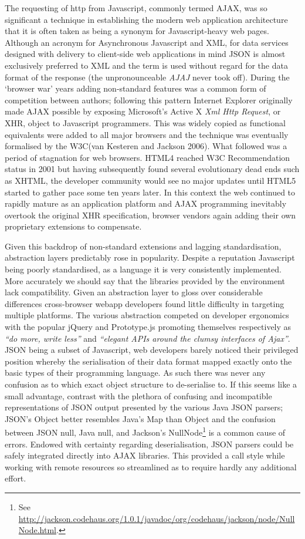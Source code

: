 \documentclass[]{article}
\begin{document}
The requesting of http from Javascript, commonly termed AJAX, was so
significant a technique in establishing the modern web application
architecture that it is often taken as being a synonym for
Javascript-heavy web pages. Although an acronym for Asynchronous
Javascript and XML, for data services designed with delivery to
client-side web applications in mind JSON is almost exclusively
preferred to XML and the term is used without regard for the data format
of the response (the unpronounceable \emph{AJAJ} never took off). During
the `browser war' years adding non-standard features was a common form
of competition between authors; following this pattern Internet Explorer
originally made AJAX possible by exposing Microsoft's Active X \emph{Xml
Http Request}, or XHR, object to Javascript programmers. This was widely
copied as functional equivalents were added to all major browsers and
the technique was eventually formalised by the W3C(van Kesteren and
Jackson 2006). What followed was a period of stagnation for web
browsers. HTML4 reached W3C Recommendation status in 2001 but having
subsequently found several evolutionary dead ends such as XHTML, the
developer community would see no major updates until HTML5 started to
gather pace some ten years later. In this context the web continued to
rapidly mature as an application platform and AJAX programming
inevitably overtook the original XHR specification, browser vendors
again adding their own proprietary extensions to compensate.

Given this backdrop of non-standard extensions and lagging
standardisation, abstraction layers predictably rose in popularity.
Despite a reputation Javascript being poorly standardised, as a language
it is very consistently implemented. More accurately we should say that
the libraries provided by the environment lack compatibility. Given an
abstraction layer to gloss over considerable differences cross-browser
webapp developers found little difficulty in targeting multiple
platforms. The various abstraction competed on developer ergonomics with
the popular jQuery and Prototype.js promoting themselves respectively as
\emph{``do more, write less''} and \emph{``elegant APIs around the
clumsy interfaces of Ajax''}. JSON being a subset of Javascript, web
developers barely noticed their privileged position whereby the
serialisation of their data format mapped exactly onto the basic types
of their programming language. As such there was never any confusion as
to which exact object structure to de-serialise to. If this seems like a
small advantage, contrast with the plethora of confusing and
incompatible representations of JSON output presented by the various
Java JSON parsers; JSON's Object better resembles Java's Map than Object
and the confusion between JSON null, Java null, and Jackson's
NullNode\footnote{See
  \url{http://jackson.codehaus.org/1.0.1/javadoc/org/codehaus/jackson/node/NullNode.html}.}
is a common cause of errors. Endowed with certainty regarding
deserialisation, JSON parsers could be safely integrated directly into
AJAX libraries. This provided a call style while working with remote
resources so streamlined as to require hardly any additional effort.
\end{document}
